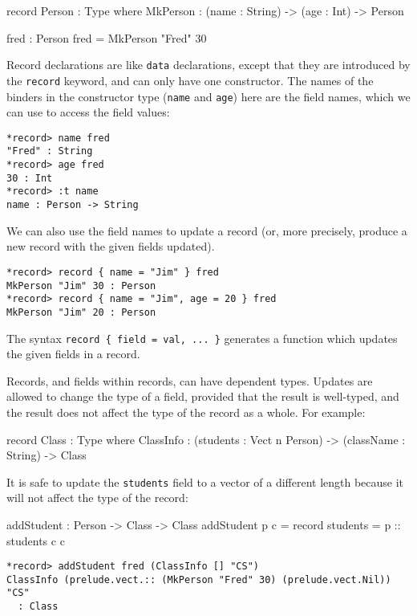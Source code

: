 \begin{code}
record Person : Type where
    MkPerson : (name : String) ->
               (age : Int) -> Person

fred : Person
fred = MkPerson "Fred" 30
\end{code}
 

\noindent
Record declarations are like \texttt{data} declarations, except that they are  introduced by the \texttt{record} keyword, and can only have one constructor.
The names of the binders in the constructor type (\texttt{name} and \texttt{age}) here are the field names, which we can use to access the field values:

\begin{lstlisting}[style=stdout]
*record> name fred
"Fred" : String
*record> age fred
30 : Int
*record> :t name
name : Person -> String
\end{lstlisting}

\noindent
We can also use the field names to update a record (or, more precisely, produce a new record with the given fields updated).

\begin{lstlisting}[style=stdout]
*record> record { name = "Jim" } fred
MkPerson "Jim" 30 : Person
*record> record { name = "Jim", age = 20 } fred
MkPerson "Jim" 20 : Person
\end{lstlisting}

\noindent
The syntax \texttt{record \{ field = val, ... \}} generates a function which updates the given fields in a record. 

Records, and fields within records, can have dependent types.
Updates are allowed to change the type of a field, provided that the result is well-typed, and the result does not affect the type of the record as a whole.
For example:

\begin{code}
record Class : Type where
    ClassInfo : (students : Vect n Person) ->
                (className : String) ->
                Class
\end{code}

\noindent
It is safe to update the \texttt{students} field to a vector of a different length because it will not affect the type of the record:

\begin{code}
addStudent : Person -> Class -> Class
addStudent p c = record { students = p :: students c } c
\end{code}

\begin{lstlisting}[style=stdout]
*record> addStudent fred (ClassInfo [] "CS")
ClassInfo (prelude.vect.:: (MkPerson "Fred" 30) (prelude.vect.Nil)) "CS" 
  : Class
\end{lstlisting}

